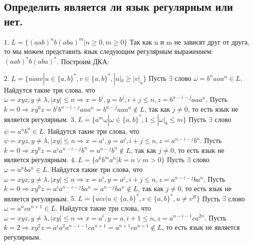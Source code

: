 \documentclass[a4paper,12pt]{article}
\begin{document}
\subsection*{Определить является ли язык регулярным или нет.}
\Large $1.\;L = \{(aab)^nb(aba)^m|n \ge 0, m \ge 0\}$\newline
Так как n и m не зависят друг от друга, то мы можем представить язык следующим регулярным выражением: \newline $(aab)^*b(aba)^*$. Построим ДКА:
\begin{center}
\newline
\end{center}
\Large $2.\;L = \{uaav|u \in \{a,b\}^*, v \in \{a,b\}^*, |u|_b \ge |v|_a\}$\newline
Пусть $\exists$ слово $\omega = b^naaa^n \in L$.  
Найдутся такие три слова, что $\omega = xyz, y \ne \lambda, |xy|\leq n \Rightarrow x = b^i, y = b^j, i+j \leq n, z = b^{n-i-j}aaa^n$. Пусть $k=0 \Rightarrow xy^0z=b^ib^{n-i-j}aaa^n = b^{n-j}aaa^n \notin L$, так как $j \ne 0$, то есть язык не является регулярным. \newline
\Large $3.\;L = \{a^m\omega|\omega \in \{a,b\}^*, 1 \le |\omega|_b \le m\}$\newline
Пусть $\exists$ слово $\psi = a^nb^n \in L$.  
Найдутся такие три слова, что $\psi = xyz, y \ne \lambda, |xy|\leq n \Rightarrow x = a^i, y = a^j, i+j \leq n, z = a^{n-i-j}b^n$. Пусть $k=0 \Rightarrow xy^0z=a^ia^{n-i-j}b^n = a^{n-j}b^n \notin L$, так как $j \ne 0$, то есть язык не является регулярным. \newline
\Large $4.\;L = \{a^kb^ma^n|k = n \vee m > 0\}$\newline
Пусть $\exists$ слово $\omega = a^nba^n \in L$.  
Найдутся такие три слова, что $\omega = xyz, y \ne \lambda, |xy|\leq n \Rightarrow x = a^i, y = a^j, i+j \leq n, z = a^{n-i-j}ba^n$. Пусть $k=0 \Rightarrow xy^0z=a^ia^{n-i-j}ba^n = a^{n-j}ba^n \notin L$, так как $j \ne 0$, то есть язык не является регулярным. \newline
\Large $5.\;L = \{ucv|u \in \{a,b\}^*, v \in \{a,b\}^*, u \ne v^R\}$\newline
Пусть $\exists$ слово $\omega = a^nca^{n+1} \in L$.  
Найдутся такие три слова, что $\omega = xyz, y \ne \lambda, |xy|\leq n \Rightarrow x = a^i, y = a, i+1 \leq n, z = a^{n-i-1}ca^{2n}$. Пусть $k=2 \Rightarrow xy^2z=a^ia^2a^{n-i-1}ca^{n+1} = a^{n+1}ca^{n+1} \notin L$, то есть язык не является регулярным. \newline
\end{document}
